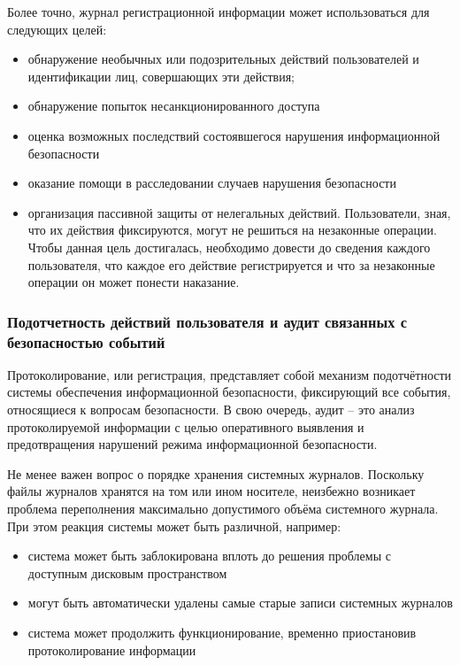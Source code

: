 Более точно, журнал регистрационной информации может использоваться для следующих целей:
\begin{itemize}
    \item обнаружение необычных или подозрительных действий пользователей и идентификации лиц,
        совершающих эти действия;
    \item обнаружение попыток несанкционированного доступа
    \item оценка возможных последствий состоявшегося нарушения информационной безопасности
    \item оказание помощи в расследовании случаев нарушения безопасности
    \item организация пассивной защиты от нелегальных действий. Пользователи, зная, что их действия
        фиксируются, могут не решиться на незаконные операции. Чтобы данная цель достигалась,
        необходимо довести до сведения каждого пользователя, что каждое его действие регистрируется
        и что за незаконные операции он может понести наказание.
\end{itemize}


\subsubsection{Подотчетность действий пользователя и аудит связанных с безопасностью событий}
Протоколирование, или регистрация, представляет собой механизм подотчётности системы обеспечения
информационной безопасности, фиксирующий все события, относящиеся к вопросам безопасности. В свою
очередь, аудит – это анализ протоколируемой информации с целью оперативного выявления и
предотвращения нарушений режима информационной безопасности.

Не менее важен вопрос о порядке хранения системных журналов. Поскольку файлы журналов хранятся на
том или ином носителе, неизбежно возникает проблема переполнения максимально допустимого объёма
системного журнала. При этом реакция системы может быть различной, например:
\begin{itemize}
    \item система может быть заблокирована вплоть до решения проблемы с доступным дисковым пространством
    \item могут быть автоматически удалены самые старые записи системных журналов
    \item система может продолжить функционирование, временно приостановив протоколирование информации
\end{itemize}


